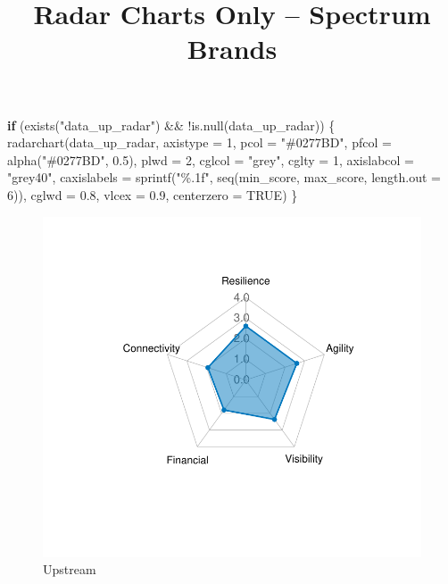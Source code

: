 \documentclass[
  letterpaper,
  DIV=11,
  numbers=noendperiod]{scrartcl}
\title{Radar Charts Only -- Spectrum Brands}
\author{}
\date{}
\newenvironment{Shaded}{\begin{snugshade}}{\end{snugshade}}
\newcommand{\AttributeTok}[1]{\textcolor[rgb]{0.40,0.45,0.13}{#1}}
\newcommand{\ConstantTok}[1]{\textcolor[rgb]{0.56,0.35,0.01}{#1}}
\newcommand{\ControlFlowTok}[1]{\textcolor[rgb]{0.00,0.23,0.31}{\textbf{#1}}}
\newcommand{\DecValTok}[1]{\textcolor[rgb]{0.68,0.00,0.00}{#1}}
\newcommand{\FloatTok}[1]{\textcolor[rgb]{0.68,0.00,0.00}{#1}}
\newcommand{\FunctionTok}[1]{\textcolor[rgb]{0.28,0.35,0.67}{#1}}
\newcommand{\NormalTok}[1]{\textcolor[rgb]{0.00,0.23,0.31}{#1}}
\newcommand{\SpecialCharTok}[1]{\textcolor[rgb]{0.37,0.37,0.37}{#1}}
\newcommand{\StringTok}[1]{\textcolor[rgb]{0.13,0.47,0.30}{#1}}
\begin{document}
\maketitle


\begin{Shaded}
\begin{Highlighting}[]
\ControlFlowTok{if}\NormalTok{ (}\FunctionTok{exists}\NormalTok{(}\StringTok{"data\_up\_radar"}\NormalTok{) }\SpecialCharTok{\&\&} \SpecialCharTok{!}\FunctionTok{is.null}\NormalTok{(data\_up\_radar)) \{}
  \FunctionTok{radarchart}\NormalTok{(data\_up\_radar, }\AttributeTok{axistype =} \DecValTok{1}\NormalTok{, }
             \AttributeTok{pcol =} \StringTok{"\#0277BD"}\NormalTok{, }\AttributeTok{pfcol =} \FunctionTok{alpha}\NormalTok{(}\StringTok{"\#0277BD"}\NormalTok{, }\FloatTok{0.5}\NormalTok{), }\AttributeTok{plwd =} \DecValTok{2}\NormalTok{,}
             \AttributeTok{cglcol =} \StringTok{"grey"}\NormalTok{, }\AttributeTok{cglty =} \DecValTok{1}\NormalTok{, }\AttributeTok{axislabcol =} \StringTok{"grey40"}\NormalTok{, }
             \AttributeTok{caxislabels =} \FunctionTok{sprintf}\NormalTok{(}\StringTok{"\%.1f"}\NormalTok{, }\FunctionTok{seq}\NormalTok{(min\_score, max\_score, }\AttributeTok{length.out =} \DecValTok{6}\NormalTok{)), }
             \AttributeTok{cglwd =} \FloatTok{0.8}\NormalTok{, }\AttributeTok{vlcex =} \FloatTok{0.9}\NormalTok{, }\AttributeTok{centerzero =} \ConstantTok{TRUE}\NormalTok{)}
\NormalTok{\}}
\end{Highlighting}
\end{Shaded}

\begin{figure}[H]

{\centering \includegraphics[width=0.9\linewidth,height=\textheight,keepaspectratio]{example_3_files/figure-pdf/unnamed-chunk-1-1.pdf}

}

\caption{Upstream}

\end{figure}%
\end{document}
